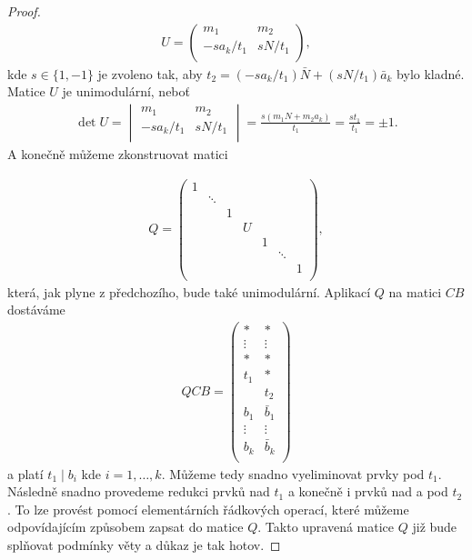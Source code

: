 \begin{proof}
\begin{align*}
U =
    \begin{pmatrix}
        m_1         & m_2      \\
        -sa_k / t_1 & sN / t_1 \\
    \end{pmatrix}
,
\end{align*}
kde $ s \in \{1, -1\} $ je zvoleno tak, aby
$ t_2 = (-sa_k / t_1) \bar{N} + (sN / t_1) \bar{a}_k $ bylo kladné. Matice $ U $
je unimodulární, neboť
\begin{align*}
\det U =
    \begin{vmatrix}
        m_1         & m_2      \\
        -sa_k / t_1 & sN / t_1 \\
    \end{vmatrix}
    = \frac{s(m_1 N + m_2 a_k)}{t_1} = \frac{s t_1}{t_1} = \pm 1
.
\end{align*}
A konečně můžeme zkonstruovat matici

\begin{align*}
Q =
    \begin{pmatrix}
        1 &        &   &   &   &        &   \\
          & \ddots &   &   &   &        &   \\
          &        & 1 &   &   &        &   \\
          &        &   & U &   &        &   \\
          &        &   &   & 1 &        &   \\
          &        &   &   &   & \ddots &   \\
          &        &   &   &   &        & 1 \\
    \end{pmatrix}
,
\end{align*}
která, jak plyne z předchozího, bude také unimodulární. Aplikací $ Q $ na matici
$ CB $ dostáváme
\begin{align*}
QCB =
    \begin{pmatrix}
        \ast   & \ast      \\
        \vdots & \vdots    \\
        \ast   & \ast      \\
        t_1    & \ast      \\
               & t_2       \\
        b_1    & \bar{b}_1 \\
        \vdots & \vdots    \\
        b_k    & \bar{b}_k \\
    \end{pmatrix}
\end{align*}
a platí $ t_1 \mid b_i$ kde $ i = 1, \dots, k $. Můžeme tedy snadno vyeliminovat
prvky pod $ t_1 $. Následně snadno provedeme redukci prvků nad $ t_1 $ a
konečně i prvků nad a pod $ t_2 $. To lze provést pomocí elementárních řádkových
operací, které můžeme odpovídajícím způsobem zapsat do matice $ Q $. Takto
upravená matice $ Q $ již bude splňovat podmínky věty a důkaz je tak hotov.

\end{proof}
